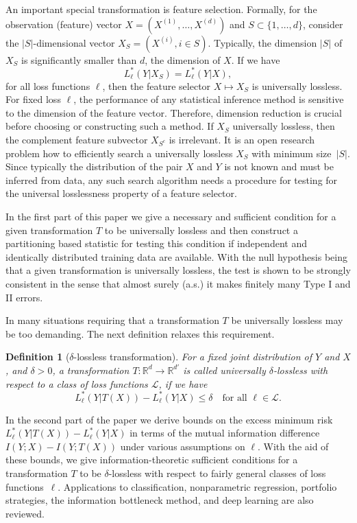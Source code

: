 \documentclass[11pt]{article}
\newtheorem{defin}{Definition}
\newcounter{aid}
\def\R{{\mathbb R}}
\def\L{\mathcal{L}}
\begin{document}
An important special transformation is feature selection.
Formally, for the observation (feature) vector  $X=(X^{(1)},\dots ,X^{(d)})$ and  $S\subset \{1,\dots ,d\}$, consider the $|S|$-dimensional vector $X_S=(X^{(i)}, i\in S)$. Typically, the dimension $|S|$ of $X_S$ is significantly smaller than $d$, the dimension of $X$. 
If we have
\[
L_\ell^*(Y|X_S) = L_\ell^*(Y|X),
\]
for all loss functions $\ell$, then the feature selector $X\mapsto X_S$ is  universally lossless. For fixed loss $\ell$, the performance of any statistical inference method is sensitive to the dimension of the feature vector. Therefore, dimension reduction is crucial before choosing or constructing such a method.
If $X_S$ universally lossless, then the complement feature subvector $X_{S^c}$
is irrelevant. It is an  open research problem  how to efficiently search a  universally lossless $X_S$ with minimum size~$|S|$. Since typically the distribution of the pair $X$ and $Y$ is not known and must be inferred from data, any such search algorithm  needs a procedure for testing for the  universal losslessness property of a feature selector. 

In the first part of this paper we give  a necessary and sufficient condition for a given transformation $T$ to be universally lossless and then  construct a partitioning based  statistic for testing this condition if independent and identically distributed training data are available. 
With the null hypothesis being that a given transformation is universally lossless, the test is shown to be strongly consistent in the sense that almost surely (a.s$.$) it makes finitely many Type I and II errors.

In many situations requiring that a transformation $T$ be universally lossless may be too demanding. The next definition relaxes this requirement.


\begin{defin}[$\delta$-lossless transformation]
  \label{def2}
For a fixed joint distribution of $Y$ and $X$, and $\delta>0$,  a transformation $T:\R^d\to
\R^{d'}$  is called \emph{universally $\delta$-lossless} with respect to a 
 class of loss functions $\L$, if we have 
\[
L_\ell^*(Y|T(X)) -L_\ell^*(Y|X) \le \delta
\quad \text{for all $\ell\in \mathcal{L}$.}
\] 
\end{defin}

In the second part of the paper we derive bounds on the excess minimum risk $L_\ell^*(Y|T(X)) -L_\ell^*(Y|X)$ in terms of the mutual information difference $I(Y;X)-I(Y;T(X))$ under various assumptions on $\ell$. 
With the aid of these bounds, we give information-theoretic sufficient conditions for a transformation $T$ to be $\delta$-lossless with respect to fairly general classes of loss functions~$\ell$. Applications to classification, nonparametric regression, portfolio strategies, the information bottleneck method,  and deep learning are also reviewed. 
\end{document}
